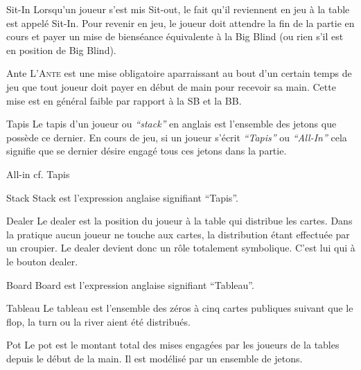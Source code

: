 \begin{df}{Sit-In}
	Lorsqu'un joueur s'est mis Sit-out, le fait qu'il reviennent en jeu à la table est appelé Sit-In. Pour revenir en jeu, le joueur doit attendre la fin de la partie en cours  et payer un mise de bienséance équivalente à la Big Blind (ou rien s'il est en position de Big Blind).
\end{df}

\begin{df}{Ante}
	\textsc{L'Ante} est une mise obligatoire aparraissant au bout d'un certain temps de jeu que tout joueur doit payer en début de main pour recevoir sa main. Cette mise est en général faible par rapport à la SB et la BB.
\end{df}

\begin{df}{Tapis}
	Le tapis d'un joueur ou \textit{``stack''} en anglais  est l'ensemble des jetons que possède ce dernier. En cours de jeu, si un joueur s'écrit \textit{``Tapis''} ou \textit{``All-In''} cela signifie que se dernier désire engagé tous ces jetons dans la partie. 
\end{df}

\begin{df}{All-in}
	cf. Tapis
\end{df}

\begin{df}{Stack}
	Stack est l'expression anglaise signifiant ``Tapis''.
\end{df}

\begin{df}{Dealer}
	Le dealer est la position du joueur à la table qui distribue les cartes. Dans la pratique aucun joueur ne touche aux cartes, la distribution étant effectuée par un croupier. Le dealer devient donc un rôle totalement symbolique. C'est lui qui à le bouton dealer. 
\end{df}

\begin{df}{Board}
	Board est l'expression anglaise signifiant ``Tableau''.
\end{df}

\begin{df}{Tableau}
	Le tableau est l'ensemble des zéros à cinq cartes publiques suivant que le flop, la turn ou la river aient été distribués. 
\end{df}

\begin{df}{Pot}
	Le pot est le montant total des mises engagées par les joueurs de la tables depuis le début de la main. Il est modélisé par un ensemble de jetons.
\end{df}

